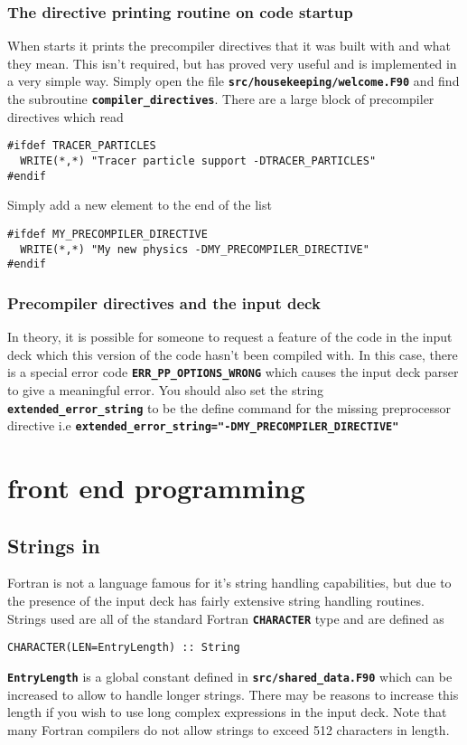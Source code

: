 \documentclass[12pt,a4paper]{article}
\newcommand{\simpleboxverbatim}{\begin{Verbatim}[obeytabs=true,frame=single,
  framerule=0.5mm,rulecolor=\color{warwickmid},formatcom=\color{black}]}
\newcommand{\inlinecode}[1]{{\color{warwickred} \bf\texttt{#1}}}
\newcommand{\EPOCH}{{\color{warwickdark}\fontfamily{phv}\selectfont{EPOCH}}}
\begin{document}
\subsubsection{The directive printing routine on code startup}
When {\EPOCH} starts it prints the precompiler directives that it was built with
and what they mean. This isn't required, but has proved very useful and is
implemented in a very simple way.  Simply open the file
\inlinecode{src/housekeeping/welcome.F90} and find the subroutine
\inlinecode{compiler\_directives}. There are a large block of precompiler
directives which read

\simpleboxverbatim
#ifdef TRACER_PARTICLES
  WRITE(*,*) "Tracer particle support -DTRACER_PARTICLES"
#endif
\end{Verbatim}

Simply add a new element to the end of the list
\simpleboxverbatim
#ifdef MY_PRECOMPILER_DIRECTIVE
  WRITE(*,*) "My new physics -DMY_PRECOMPILER_DIRECTIVE"
#endif
\end{Verbatim}

\subsubsection{Precompiler directives and the input deck}
In theory, it is possible for someone to request a feature of the code in the
input deck which this version of the code hasn't been compiled with. In this
case, there is a special error code \inlinecode{ERR\_PP\_OPTIONS\_WRONG} which
causes the input deck parser to give a meaningful error. You should also set
the string \inlinecode{extended\_error\_string} to be the define command for
the missing preprocessor directive i.e
\inlinecode{extended\_error\_string="-DMY\_PRECOMPILER\_DIRECTIVE"}

\section{{\EPOCH} front end programming}

\subsection{Strings in {\EPOCH}}
Fortran is not a language famous for it's string handling capabilities, but due
to the presence of the input deck {\EPOCH} has fairly extensive string handling
routines. Strings used are all of the standard Fortran \inlinecode{CHARACTER}
type and are defined as
\simpleboxverbatim
CHARACTER(LEN=EntryLength) :: String
\end{Verbatim}
\inlinecode{EntryLength} is a global constant defined in
\inlinecode{src/shared\_data.F90} which can be increased to allow {\EPOCH} to
handle longer strings. There may be reasons to increase this length if you wish
to use long complex expressions in the input deck. Note that many Fortran
compilers do not allow strings to exceed 512 characters in length.
\end{document}
